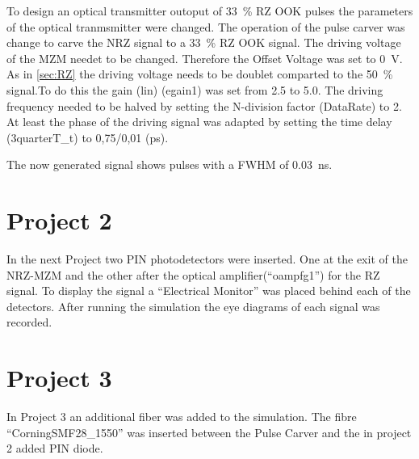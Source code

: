 To design an optical transmitter outoput of 33~\% RZ OOK pulses the parameters of the optical tranmsmitter were changed. 
The operation of the pulse carver was change to carve the NRZ signal to a 33~\% RZ OOK signal. The driving voltage of the MZM needet to be changed. Therefore the Offset Voltage was set to 0~V. As in \ref{sec:RZ} the driving voltage needs to be doublet comparted to the 50~\% signal.To do this the gain (lin) (egain1) was set from 2.5 to 5.0. The driving frequency needed to be halved by setting the N-division factor (DataRate) to 2.
At least the phase of the driving signal was adapted by setting the time delay (3quarterT\_t) to 0,75/0,01 (ps).

The now generated signal shows pulses with a FWHM of 0.03~ns.



\section{Project 2}
In the next Project two PIN photodetectors were inserted. One at the exit of the NRZ-MZM and the other after the optical amplifier("`oampfg1"') for the RZ signal. To display the signal a "`Electrical Monitor"' was placed behind each of the detectors. After running the simulation the eye diagrams of each signal was recorded.






\section{Project 3}
\label{sec:P3}
In Project 3 an additional fiber was added to the simulation. The fibre "`CorningSMF28\_1550"' was inserted between the Pulse Carver and the in project 2 added PIN diode. 

